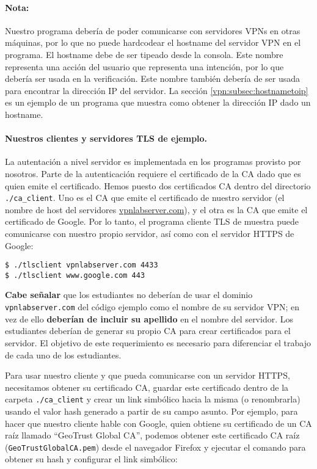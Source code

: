 \paragraph{Nota:} Nuestro programa \miniVPN debería de poder comunicarse con servidores VPNs en otras máquinas, por lo que no puede hardcodear el hostname del servidor VPN en el programa. El hostname debe de ser tipeado desde la consola. Este nombre representa una acción del usuario que representa una intención, por lo que debería ser usada en la verificación. Este nombre también debería de ser usada para encontrar la dirección IP del servidor. La sección \ref{vpn:subsec:hostnametoip} es un ejemplo de un programa que muestra como obtener la dirección IP dado un hostname.


\paragraph{Nuestros clientes y servidores TLS de ejemplo.}  La autentación a nivel servidor es implementada en los programas provisto por nosotros. Parte de la autenticación requiere el certificado de la CA dado que es quien emite el certificado.
Hemos puesto dos certificados CA dentro del directorio \texttt{./ca\_client}. Uno es el CA que emite el certificado de nuestro servidor (el nombre de host del servidores \url{vpnlabserver.com}),
y el otra es la CA que emite el certificado de Google.
Por lo tanto, el programa cliente TLS de muestra puede comunicarse con nuestro propio servidor, así como con el servidor HTTPS de Google: 

\begin{lstlisting}
$ ./tlsclient vpnlabserver.com 4433
$ ./tlsclient www.google.com 443
\end{lstlisting}


\textbf{Cabe señalar} que los estudiantes no deberían de usar el dominio \texttt{vpnlabserver.com} del código ejemplo como el nombre de su servidor VPN; en vez de ello \textbf{deberían de incluir su apellido} en el nombre del servidor. Los estudiantes deberían de generar su propio CA para crear certificados para el servidor. El objetivo de este requerimiento es necesario para diferenciar el trabajo de cada uno de los estudiantes.

Para usar nuestro cliente y que pueda comunicarse con un servidor HTTPS, necesitamos obtener su certificado CA, guardar este certificado dentro de la carpeta \texttt{./ca\_client}  y crear un link simbólico hacia la misma (o renombrarla) usando el valor hash generado a partir de su campo asunto.
Por ejemplo, para hacer que nuestro cliente hable con Google, quien obtiene su certificado de un CA raíz llamado ``GeoTrust Global CA'', podemos obtener este certificado CA raíz  (\texttt{GeoTrustGlobalCA.pem})   desde el navegador Firefox y ejecutar el comando para obtener su hash y configurar el link simbólico:


